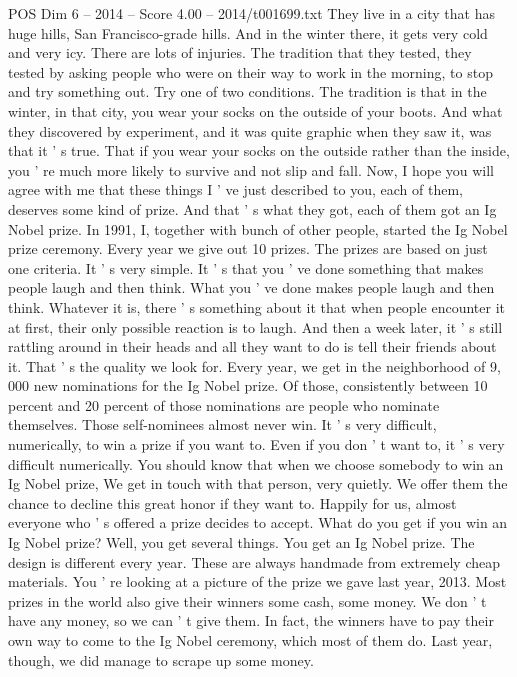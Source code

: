 \begin{textsample}{POS Dim 6 – 2014 – Score 4.00 – 2014/t001699.txt}
They live in a city that has huge hills, San Francisco-grade hills.
And in the winter there, it gets very cold and very icy.
There are lots of injuries.
The tradition that they tested, they tested by asking people who were on their way to work in the morning, to stop and try something out.
Try one of two conditions.
The tradition is that in the winter, in that city, you wear your socks on the outside of your boots.
And what they discovered by experiment, and it was quite graphic when they saw it, was that it ' s true.
That if you wear your socks on the outside rather than the inside, you ' re much more likely to survive and not slip and fall.
Now, I hope you will agree with me that these things I ' ve just described to you, each of them, deserves some kind of prize.
And that ' s what they got, each of them got an Ig Nobel prize.
In 1991, I, together with bunch of other people, started the Ig Nobel prize ceremony.
Every year we give out 10 prizes.
The prizes are based on just one criteria.
It ' s very simple.
It ' s that you ' ve done something that makes people laugh and then think.
What you ' ve done makes people laugh and then think.
Whatever it is, there ' s something about it that when people encounter it at first, their only possible reaction is to laugh.
And then a week later, it ' s still rattling around in their heads and all they want to do is tell their friends about it.
That ' s the quality we look for.
Every year, we get in the neighborhood of 9, 000 new nominations for the Ig Nobel prize.
Of those, consistently between 10 percent and 20 percent of those nominations are people who nominate themselves.
Those self-nominees almost never win.
It ' s very difficult, numerically, to win a prize if you want to.
Even if you don ' t want to, it ' s very difficult numerically.
You should know that when we choose somebody to win an Ig Nobel prize, We get in touch with that person, very quietly.
We offer them the chance to decline this great honor if they want to.
Happily for us, almost everyone who ' s offered a prize decides to accept.
What do you get if you win an Ig Nobel prize?
Well, you get several things.
You get an Ig Nobel prize.
The design is different every year.
These are always handmade from extremely cheap materials.
You ' re looking at a picture of the prize we gave last year, 2013.
Most prizes in the world also give their winners some cash, some money.
We don ' t have any money, so we can ' t give them.
In fact, the winners have to pay their own way to come to the Ig Nobel ceremony, which most of them do.
Last year, though, we did manage to scrape up some money.

\end{textsample}
